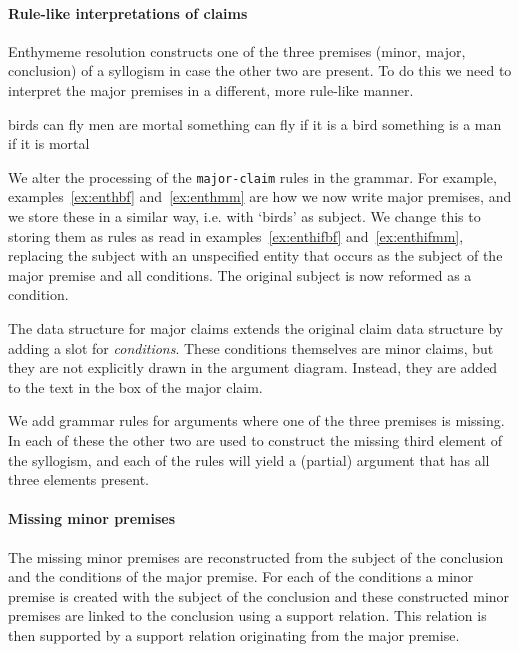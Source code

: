\paragraph{Rule-like interpretations of claims}
Enthymeme resolution constructs one of the three premises (minor, major, conclusion) of a syllogism in case the other two are present. To do this we need to interpret the major premises in a different, more rule-like manner.

\begin{exe}
    \ex\label{ex:enthbf} birds can fly
    \ex\label{ex:enthmm} men are mortal
    \ex\label{ex:enthifbf} something can fly if it is a bird
    \ex\label{ex:enthifmm} something is a man if it is mortal
\end{exe}

\noindent We alter the processing of the \texttt{major-claim} rules in the grammar. For example, examples~\ref{ex:enthbf} and~\ref{ex:enthmm} are how we now write major premises, and we store these in a similar way, i.e. with `birds' as subject. We change this to storing them as rules as read in examples~\ref{ex:enthifbf} and~\ref{ex:enthifmm}, replacing the subject with an unspecified entity that occurs as the subject of the major premise and all conditions. The original subject is now reformed as a condition.

The data structure for major claims  extends the original claim data structure by adding a slot for \emph{conditions}. These conditions themselves are minor claims, but they are not explicitly drawn in the argument diagram. Instead, they are added to the text in the box of the major claim.

We add grammar rules for arguments where one of the three premises is missing. In each of these the other two are used to construct the missing third element of the syllogism, and each of the rules will yield a (partial) argument that has all three elements present.

\paragraph{Missing minor premises}
The missing minor premises are reconstructed from the subject of the conclusion and the conditions of the major premise. For each of the conditions a minor premise is created with the subject of the conclusion and these constructed minor premises are linked to the conclusion using a support relation. This relation is then supported by a support relation originating from the major premise.

